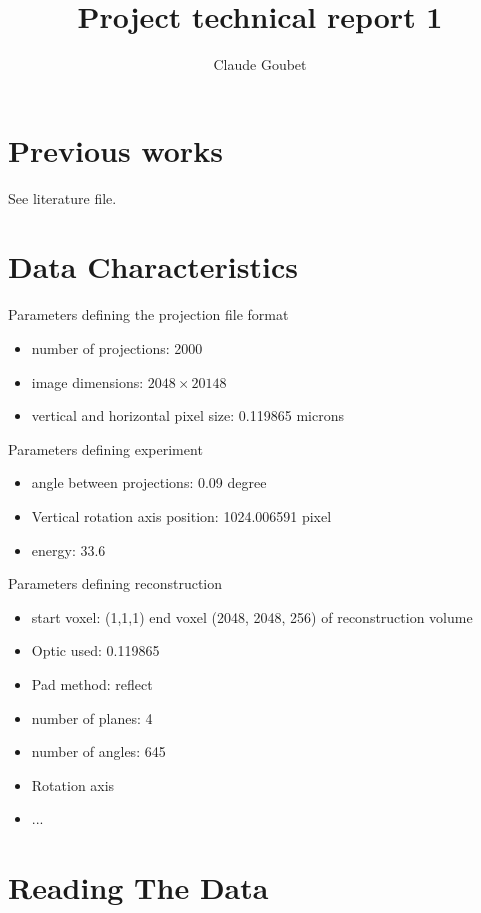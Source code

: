 \documentclass[10pt,a4paper,titlepage]{article}
\author{Claude Goubet}
\title{Project technical report 1}
\begin{document}
\maketitle


\section{Previous works}
	See literature file.

\section{Data Characteristics}

Parameters defining the projection file format

\begin{itemize}
	\item number of projections: 2000
	\item image dimensions: $2048 \times 20148$
	\item vertical and horizontal pixel size: 0.119865 microns
\end{itemize}

Parameters defining experiment

\begin{itemize}


	\item angle between projections: 0.09 degree
	\item Vertical rotation axis position: 1024.006591 pixel
	\item energy: 33.6
\end{itemize}

Parameters defining reconstruction

\begin{itemize}
	\item start voxel: (1,1,1) end voxel (2048, 2048, 256) of reconstruction volume
	\item Optic used: 0.119865	
	\item Pad method: reflect
	\item number of planes: 4
	\item number of angles: 645
	\item Rotation axis
	\item ...
	
\end{itemize}
\clearpage
\section{Reading The Data}
\end{document}
